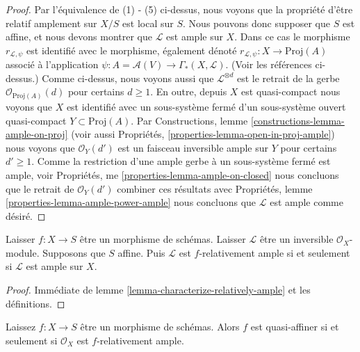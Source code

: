 \begin{proof}
\medskip\noindent

Par l'équivalence de (1) - (5) ci-dessus, nous voyons que la propriété d'être relatif amplement sur $X/S$ est local sur $S$. Nous pouvons donc supposer que $S$ est affine, et nous devons montrer que
$\mathcal{L}$ est ample sur $X$. Dans ce cas le morphisme
$r_{\mathcal{L}, \psi}$ est identifié avec le morphisme, également dénoté
$r_{\mathcal{L}, \psi} : X \to \text{Proj}(A)$ associé à l'application
$\psi : A = \mathcal{A}(V) \to \Gamma_*(X, \mathcal{L})$. (Voir les références ci-dessus.) Comme ci-dessus, nous voyons aussi que
$\mathcal{L}^{\otimes d}$ est le retrait de la gerbe
$\mathcal{O}_{\text{Proj}(A)}(d)$ pour certains $d \geq 1$. En outre, depuis $X$ est quasi-compact nous voyons que $X$ est identifié avec un sous-système fermé d'un sous-système ouvert quasi-compact $Y \subset \text{Proj}(A)$. Par Constructions, lemme
\ref{constructions-lemma-ample-on-proj}
(voir aussi Propriétés,
\ref{properties-lemma-open-in-proj-ample}) nous voyons que $\mathcal{O}_Y(d')$ est un faisceau inversible ample sur
$Y$ pour certains $d' \geq 1$. Comme la restriction d'une ample gerbe à un sous-système fermé est ample, voir Propriétés, me
\ref{properties-lemma-ample-on-closed}
nous concluons que le retrait de
$\mathcal{O}_Y(d')$ combiner ces résultats avec Propriétés, lemme
\ref{properties-lemma-ample-power-ample}
nous concluons que $\mathcal{L}$ est ample comme désiré.

\end{proof}

\begin{lemma}

\label{lemma-ample-over-affine}

\begin{reference}
\cite[II corollaire 4.6.6]{EGA}
\end{reference}
Laisser $f : X \to S$ être un morphisme de schémas. Laisser $\mathcal{L}$ être un inversible $\mathcal{O}_X$-module. Supposons que $S$ affine. Puis $\mathcal{L}$ est $f$-relativement ample si et seulement si $\mathcal{L}$ est ample sur $X$.
\end{lemma}

\begin{proof}
Immédiate de lemme \ref{lemma-characterize-relatively-ample} et les définitions.
\end{proof}

\begin{lemma}

\label{lemma-quasi-affine-O-ample}

\begin{reference}
\cite[II proposition 5.1.6]{EGA}
\end{reference}
Laissez $f : X \to S$ être un morphisme de schémas. Alors $f$ est quasi-affiner si et seulement si $\mathcal{O}_X$ est $f$-relativement ample.
\end{lemma}

